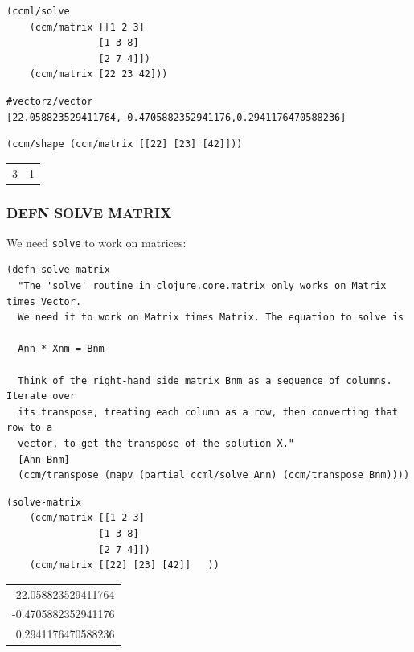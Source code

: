 \documentclass[10pt,oneside,x11names]{article}
\begin{document}
\begin{verbatim}
(ccml/solve
    (ccm/matrix [[1 2 3]
                [1 3 8]
                [2 7 4]])
    (ccm/matrix [22 23 42]))
\end{verbatim}

\begin{verbatim}
#vectorz/vector [22.058823529411764,-0.4705882352941176,0.2941176470588236]
\end{verbatim}


\begin{verbatim}
(ccm/shape (ccm/matrix [[22] [23] [42]]))
\end{verbatim}

\begin{center}
\begin{tabular}{rr}
3 & 1\\
\end{tabular}
\end{center}

\subsubsection{DEFN SOLVE MATRIX}
\label{sec:org8f1e385}

We need \texttt{solve} to work on matrices:

\begin{verbatim}
(defn solve-matrix
  "The 'solve' routine in clojure.core.matrix only works on Matrix times Vector.
  We need it to work on Matrix times Matrix. The equation to solve is

  Ann * Xnm = Bnm

  Think of the right-hand side matrix Bnm as a sequence of columns. Iterate over
  its transpose, treating each column as a row, then converting that row to a
  vector, to get the transpose of the solution X."
  [Ann Bnm]
  (ccm/transpose (mapv (partial ccml/solve Ann) (ccm/transpose Bnm))))
\end{verbatim}

\begin{verbatim}
(solve-matrix
    (ccm/matrix [[1 2 3]
                [1 3 8]
                [2 7 4]])
    (ccm/matrix [[22] [23] [42]]   ))
\end{verbatim}

\begin{center}
\begin{tabular}{r}
22.058823529411764\\
-0.4705882352941176\\
0.2941176470588236\\
\end{tabular}
\end{center}
\end{document}
